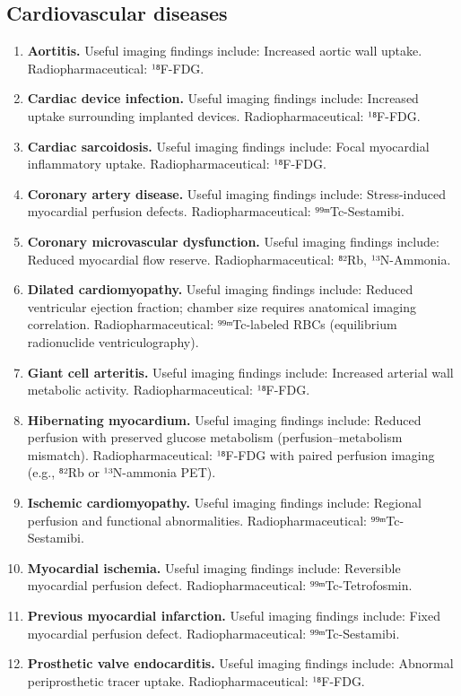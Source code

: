 \subsection{Cardiovascular diseases}
\begin{enumerate}[leftmargin=*,itemsep=0.45em,topsep=0.4em]
\item \textbf{Aortitis.} Useful imaging findings include: Increased aortic wall uptake. Radiopharmaceutical: ¹⁸F-FDG.
\item \textbf{Cardiac device infection.} Useful imaging findings include: Increased uptake surrounding implanted devices. Radiopharmaceutical: ¹⁸F-FDG.
\item \textbf{Cardiac sarcoidosis.} Useful imaging findings include: Focal myocardial inflammatory uptake. Radiopharmaceutical: ¹⁸F-FDG.
\item \textbf{Coronary artery disease.} Useful imaging findings include: Stress-induced myocardial perfusion defects. Radiopharmaceutical: ⁹⁹ᵐTc-Sestamibi.
\item \textbf{Coronary microvascular dysfunction.} Useful imaging findings include: Reduced myocardial flow reserve. Radiopharmaceutical: ⁸²Rb, ¹³N-Ammonia.
\item \textbf{Dilated cardiomyopathy.} Useful imaging findings include: Reduced ventricular ejection fraction; chamber size requires anatomical imaging correlation. Radiopharmaceutical: ⁹⁹ᵐTc-labeled RBCs (equilibrium radionuclide ventriculography).
\item \textbf{Giant cell arteritis.} Useful imaging findings include: Increased arterial wall metabolic activity. Radiopharmaceutical: ¹⁸F-FDG.
\item \textbf{Hibernating myocardium.} Useful imaging findings include: Reduced perfusion with preserved glucose metabolism (perfusion--metabolism mismatch). Radiopharmaceutical: ¹⁸F-FDG with paired perfusion imaging (e.g., ⁸²Rb or ¹³N-ammonia PET).
\item \textbf{Ischemic cardiomyopathy.} Useful imaging findings include: Regional perfusion and functional abnormalities. Radiopharmaceutical: ⁹⁹ᵐTc-Sestamibi.
\item \textbf{Myocardial ischemia.} Useful imaging findings include: Reversible myocardial perfusion defect. Radiopharmaceutical: ⁹⁹ᵐTc-Tetrofosmin.
\item \textbf{Previous myocardial infarction.} Useful imaging findings include: Fixed myocardial perfusion defect. Radiopharmaceutical: ⁹⁹ᵐTc-Sestamibi.
\item \textbf{Prosthetic valve endocarditis.} Useful imaging findings include: Abnormal periprosthetic tracer uptake. Radiopharmaceutical: ¹⁸F-FDG.

\end{enumerate}
